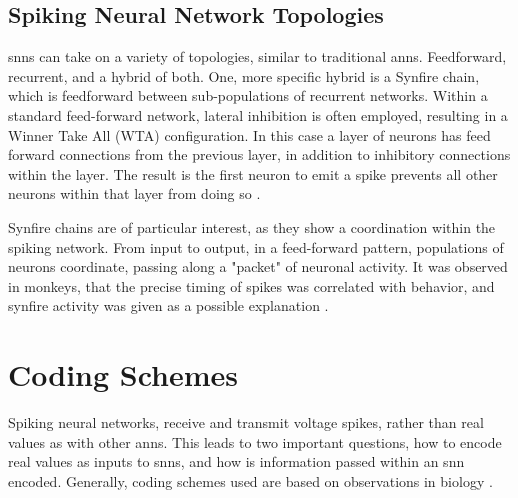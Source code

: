     
    \subsection{Spiking Neural Network Topologies}
    \Glspl{snn} can take on a variety of topologies, similar to traditional
    \glspl{ann}. Feedforward, recurrent, and a hybrid of both. One, more specific
    hybrid is a Synfire chain, which is feedforward between sub-populations of
    recurrent networks. Within a standard feed-forward network, lateral
    inhibition is often employed, resulting in a Winner Take All (WTA)
    configuration. In this case a layer of neurons has feed forward connections
    from the previous layer, in addition to inhibitory connections within the
    layer. The result is the first neuron to emit a spike prevents all other
    neurons within that layer from doing so \parencite{ponulak_2011}.
    
    Synfire chains are of particular interest, as they show a coordination
    within the spiking network. From input to output, in a feed-forward pattern,
    populations of neurons coordinate, passing along a "packet" of neuronal
    activity. It was observed in monkeys, that the precise timing of spikes was
    correlated with behavior, and synfire activity was given as a possible
    explanation \parencite{aertsen_1996}.
    
    \section{Coding Schemes}
    Spiking neural networks, receive and transmit voltage spikes, rather than
    real values as with other \Glspl{ann}. This leads to two important
    questions, how to encode real values as inputs to \Glspl{snn}, and how is
    information passed within an \Gls{snn} encoded. Generally, coding schemes
    used are based on observations in biology \parencite{ponulak_2011}.
    
